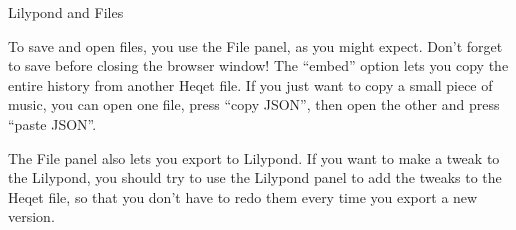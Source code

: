 \documentclass{article}
\begin{document}
\begin{section}{Lilypond and Files}

To save and open files, you use the File panel, as you might expect. Don't forget to save before closing the browser window! The ``embed'' option lets you copy the entire history from another Heqet file. If you just want to copy a small piece of music, you can open one file, press ``copy JSON'', then open the other and press ``paste JSON''. 

The File panel also lets you export to Lilypond. If you want to make a tweak to the Lilypond, you should try to use the Lilypond panel to add the tweaks to the Heqet file, so that you don't have to redo them every time you export a new version.

\end{section}
\end{document}
